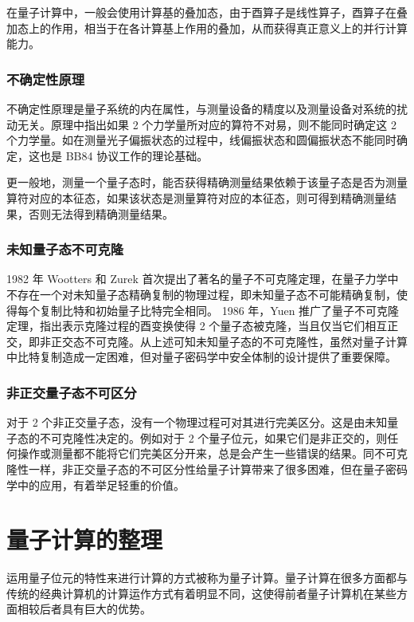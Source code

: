 在量子计算中，一般会使用计算基的叠加态，由于酉算子是线性算子，酉算子在叠加态上的作用，相当于在各计算基上作用的叠加，从而获得真正意义上的并行计算能力。

\subsubsection{不确定性原理}

不确定性原理是量子系统的内在属性，与测量设备的精度以及测量设备对系统的扰动无关。原理中指出如果 2 个力学量所对应的算符不对易，则不能同时确定这 2 个力学量。如在测量光子偏振状态的过程中，线偏振状态和圆偏振状态不能同时确定，这也是 BB84 协议工作的理论基础。

更一般地，测量一个量子态时，能否获得精确测量结果依赖于该量子态是否为测量算符对应的本征态，如果该状态是测量算符对应的本征态，则可得到精确测量结果，否则无法得到精确测量结果。

\subsubsection{未知量子态不可克隆}

1982 年 Wootters 和 Zurek 首次提出了著名的量子不可克隆定理，在量子力学中不存在一个对未知量子态精确复制的物理过程，即未知量子态不可能精确复制，使得每个复制比特和初始量子比特完全相同。 1986 年，Yuen 推广了量子不可克隆定理，指出表示克隆过程的酉变换使得 2 个量子态被克隆，当且仅当它们相互正交，即非正交态不可克隆。从上述可知未知量子态的不可克隆性，虽然对量子计算中比特复制造成一定困难，但对量子密码学中安全体制的设计提供了重要保障。

\subsubsection{非正交量子态不可区分}

对于 2 个非正交量子态，没有一个物理过程可对其进行完美区分。这是由未知量子态的不可克隆性决定的。例如对于 2 个量子位元，如果它们是非正交的，则任何操作或测量都不能将它们完美区分开来，总是会产生一些错误的结果。同不可克隆性一样，非正交量子态的不可区分性给量子计算带来了很多困难，但在量子密码学中的应用，有着举足轻重的价值。

\section{量子计算的整理}

运用量子位元的特性来进行计算的方式被称为量子计算。量子计算在很多方面都与传统的经典计算机的计算运作方式有着明显不同，这使得前者量子计算机在某些方面相较后者具有巨大的优势。

